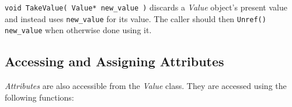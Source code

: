 \begin{sloppy}
\begin{list}{}{}
\item[{\tt void TakeValue( Value* new\_value )}] discards a {\em Value}
object's present value and instead uses {\tt new\_value} for its value.
The caller should then {\tt Unref()} {\tt new\_value} when otherwise
done using it.

\end{list}
\end{sloppy}

\subsection{Accessing and Assigning Attributes}

{\em Attributes} are also accessible from the {\em Value} class. They
are accessed using the following functions:

